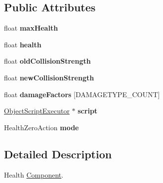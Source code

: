 \subsection*{\-Public \-Attributes}
\begin{DoxyCompactItemize}
\item 
\hypertarget{classComponentHealth_a1f1f1775d3ef6b5277bfb5b9d3e5b1e1}{
float {\bfseries max\-Health}}
\label{dc/d15/classComponentHealth_a1f1f1775d3ef6b5277bfb5b9d3e5b1e1}

\item 
\hypertarget{classComponentHealth_ae48ec4e2e5653f023de3b02f3c0f1421}{
float {\bfseries health}}
\label{dc/d15/classComponentHealth_ae48ec4e2e5653f023de3b02f3c0f1421}

\item 
\hypertarget{classComponentHealth_a11c5a668c3bf84eaa4b4547db2711905}{
float {\bfseries old\-Collision\-Strength}}
\label{dc/d15/classComponentHealth_a11c5a668c3bf84eaa4b4547db2711905}

\item 
\hypertarget{classComponentHealth_a00eef2a3589f1d4188cfa4b804ce698a}{
float {\bfseries new\-Collision\-Strength}}
\label{dc/d15/classComponentHealth_a00eef2a3589f1d4188cfa4b804ce698a}

\item 
\hypertarget{classComponentHealth_ad48e344014fc7a72502665b4e95641e1}{
float {\bfseries damage\-Factors} \mbox{[}\-D\-A\-M\-A\-G\-E\-T\-Y\-P\-E\-\_\-\-C\-O\-U\-N\-T\mbox{]}}
\label{dc/d15/classComponentHealth_ad48e344014fc7a72502665b4e95641e1}

\item 
\hypertarget{classComponentHealth_a7362c59b62e8cf9b4f8a25f715e2ec54}{
\hyperlink{classObjectScriptExecutor}{\-Object\-Script\-Executor} $\ast$ {\bfseries script}}
\label{dc/d15/classComponentHealth_a7362c59b62e8cf9b4f8a25f715e2ec54}

\item 
\hypertarget{classComponentHealth_aa7ff728e46427534a9dc2e7ce979b958}{
\-Health\-Zero\-Action {\bfseries mode}}
\label{dc/d15/classComponentHealth_aa7ff728e46427534a9dc2e7ce979b958}

\end{DoxyCompactItemize}


\subsection{\-Detailed \-Description}
\-Health \hyperlink{classComponent}{\-Component}. 

